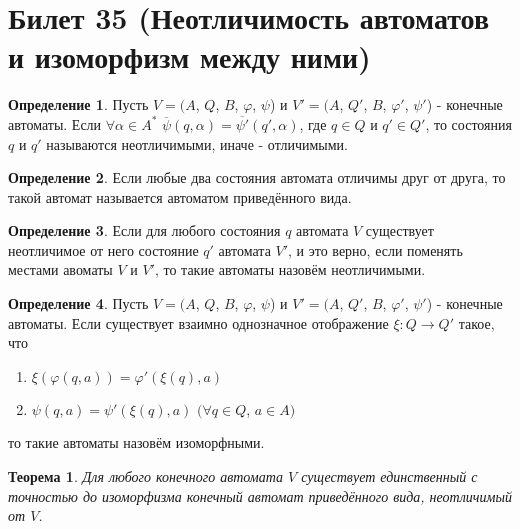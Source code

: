 \documentclass[a4paper, 12pt]{article}
\renewcommand{\phi}{\varphi}
\theoremstyle{definition}
\newtheorem*{definition}{Определение}
\theoremstyle{plain}
\newtheorem*{theorem}{Теорема}
\theoremstyle{remark}
\begin{document}
  \section{Билет 35 (Неотличимость автоматов и изоморфизм между ними)}
  \begin{definition}
    Пусть $V=(A$, $Q$, $B$, $\phi$, $\psi$) и $V'=(A$, $Q'$, $B$, $\phi'$, $\psi'$) - конечные автоматы. Если $\forall\alpha\in A^*$ $\overline{\psi}(q, \alpha)=\overline{\psi'}(q', \alpha)$, где $q\in Q$ и $q'\in Q'$, то состояния $q$ и $q'$ называются неотличимыми, иначе - отличимыми.
  \end{definition}
  \begin{definition}
    Если любые два состояния автомата отличимы друг от друга, то такой автомат называется автоматом приведённого вида.
  \end{definition}
  \begin{definition}
    Если для любого состояния $q$ автомата $V$ существует неотличимое от него состояние $q'$ автомата $V'$, и это верно, если поменять местами авоматы $V$ и $V'$, то такие автоматы назовём неотличимыми.
  \end{definition}
  \begin{definition}
    Пусть $V=(A$, $Q$, $B$, $\phi$, $\psi$) и $V'=(A$, $Q'$, $B$, $\phi'$, $\psi'$) - конечные автоматы. Если существует взаимно однозначное отображение $\xi:Q\rightarrow Q'$ такое, что
    \begin{enumerate}
      \item $\xi(\phi(q,a))=\phi'(\xi(q),a)$\\
      \item $\psi(q,a)=\psi'(\xi(q),a)$ $(\forall q\in Q$, $a\in A)$
    \end{enumerate}
    то такие автоматы назовём изоморфными.
  \end{definition}
  \begin{theorem}
    Для любого конечного автомата $V$ существует единственный с точностью до изоморфизма конечный автомат приведённого вида, неотличимый от $V$.
  \end{theorem}
\end{document}
